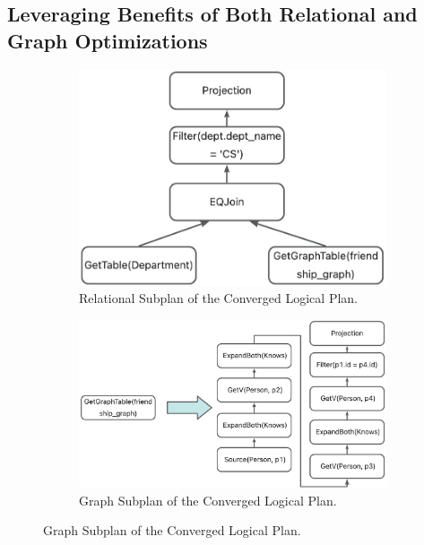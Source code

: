 \subsection{Leveraging Benefits of Both Relational and Graph Optimizations}
\label{sec:framework:combination}

\begin{figure}
    \centering
    \begin{subfigure}[b]{0.4\linewidth}
        \centering
        \includegraphics[width=\linewidth]{./figures/converged-logical-plan-relational.png}
        \caption{Relational Subplan of the Converged Logical Plan.}
        \label{fig:converged-logical-plan-relational}
    \end{subfigure}
    \begin{subfigure}[b]{0.4\linewidth}
        \centering
        \includegraphics[width=\linewidth]{./figures/converged-logical-plan-graph.png}
        \caption{Graph Subplan of the Converged Logical Plan.}
        \label{fig:converged-logical-plan-graph}

\end{subfigure}
\end{figure}
